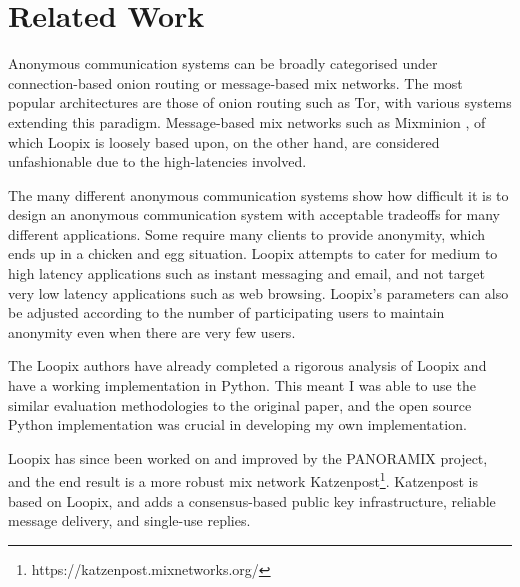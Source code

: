 \documentclass[final,dissertation.tex]{subfiles}
\begin{document}
\section{Related Work}

Anonymous communication systems can be broadly categorised under connection-based onion routing or message-based mix networks. The most popular architectures are those of onion routing such as Tor, with various systems extending this paradigm. Message-based mix networks such as Mixminion \cite{danezis2003mixminion}, of which Loopix is loosely based upon, on the other hand, are considered unfashionable due to the high-latencies involved.

The many different anonymous communication systems show how difficult it is to design an anonymous communication system with acceptable tradeoffs for many different applications. Some require many clients to provide anonymity, which ends up in a chicken and egg situation. Loopix attempts to cater for medium to high latency applications such as instant messaging and email, and not target very low latency applications such as web browsing. Loopix's parameters can also be adjusted according to the number of participating users to maintain anonymity even when there are very few users.

The Loopix authors have already completed a rigorous analysis of Loopix and have a working implementation in Python. This meant I was able to use the similar evaluation methodologies to the original paper, and the open source Python implementation was crucial in developing my own implementation.

Loopix has since been worked on and improved by the PANORAMIX project, and the end result is a more robust mix network Katzenpost\footnote{https://katzenpost.mixnetworks.org/}. Katzenpost is based on Loopix, and adds a consensus-based public key infrastructure, reliable message delivery, and single-use replies.
\end{document}
